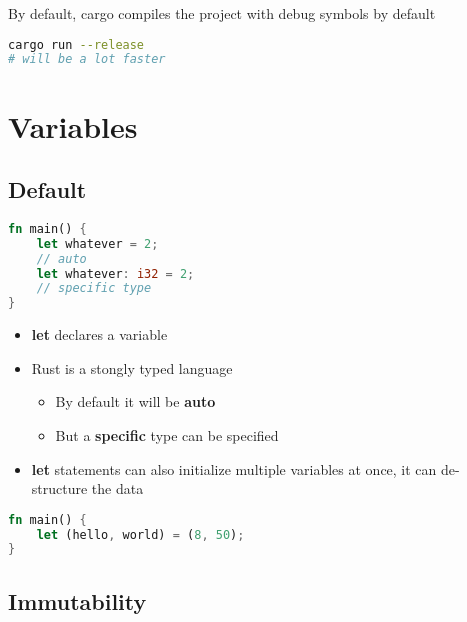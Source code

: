 \documentclass{report}
\begin{document}
By default, cargo compiles the project with debug symbols by default
\begin{tcolorbox}[title=Disable Debug Symbols,colback=backcolour]
\begin{lstlisting}[language=bash]
cargo run --release
# will be a lot faster
\end{lstlisting}
\end{tcolorbox}


\section{Variables}

\subsection{Default}

\begin{tcolorbox}[title=Structure,colback=backcolour]
\begin{lstlisting}[language=rust]
fn main() {
	let whatever = 2;
	// auto
	let whatever: i32 = 2;
	// specific type
}
\end{lstlisting}
\end{tcolorbox}

\begin{itemize}
	\item \textbf{let} declares a variable 
	\item Rust is a stongly typed language
		\begin{itemize}
			\item By default it will be \textbf{auto} 
			\item But a \textbf{specific} type can be specified
		\end{itemize}
\end{itemize}

\begin{itemize}
	\item \textbf{let} statements can also initialize multiple variables at once, it can de-structure the data
\end{itemize}

\begin{tcolorbox}[title=Deconstruction Example,colback=backcolour]
\begin{lstlisting}[language=rust]
fn main() {
	let (hello, world) = (8, 50);
}
\end{lstlisting}
\end{tcolorbox}

\subsection{Immutability}
\end{document}
